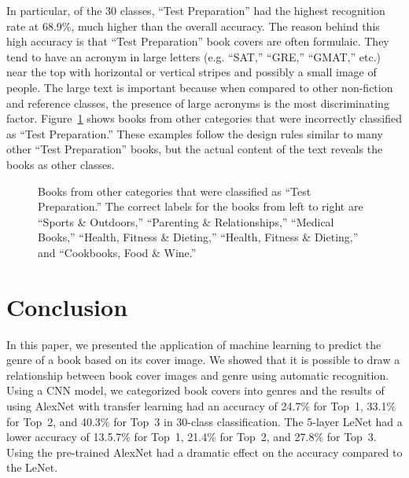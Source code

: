 \documentclass[conference]{IEEEtran}
\begin{document}
In particular, of the 30 classes, ``Test Preparation'' had the highest recognition rate at 68.9\%, much higher than the overall accuracy.
The reason behind this high accuracy is that ``Test Preparation'' book covers are often formulaic. 
They tend to have an acronym in large letters (e.g.  ``SAT,'' ``GRE,'' ``GMAT,'' etc.) near the top with horizontal or vertical stripes and possibly a small image of people.
The large text is important because when compared to other non-fiction and reference classes, the presence of large acronyms is the most discriminating factor.
Figure~\ref{misclasstest} shows books from other categories that were incorrectly classified as ``Test Preparation.''
These examples follow the design rules similar to many other ``Test Preparation'' books, but the actual content of the text reveals the books as other classes. 


\begin{figure}
\begin{center}
\setlength\fboxsep{1pt}
\setlength\fboxrule{0pt}

\end{center}
\caption{\label{misclasstest} Books from other categories that were classified as ``Test Preparation.'' The correct labels for the books from left to right are ``Sports \& Outdoors,'' ``Parenting \& Relationships,'' ``Medical Books,'' ``Health, Fitness \& Dieting,'' ``Health, Fitness \& Dieting,'' and ``Cookbooks, Food \& Wine.'' }
\end{figure}

\section{Conclusion}
\label{conclusion}
In this paper, we presented the application of machine learning to predict the genre of a book based on its cover image.
We showed that it is possible to draw a relationship between book cover images and genre using automatic recognition.
Using a CNN model, we categorized book covers into genres and the results of using AlexNet with transfer learning had an accuracy of 24.7\% for Top~1, 33.1\% for Top~2, and 40.3\% for Top~3 in 30-class classification.
The 5-layer LeNet had a lower accuracy of 13.5.7\% for Top~1, 21.4\% for Top~2, and 27.8\% for Top~3.
Using the pre-trained AlexNet had a dramatic effect on the accuracy compared to the LeNet.
\end{document}
